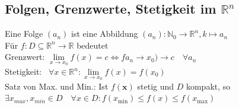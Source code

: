 \documentclass[6pt,a4paper]{scrartcl}
\newcommand{\norm}[1]{\ensuremath{\|#1\|}}														%
\renewcommand{\vec}[1]{\ensuremath{\boldsymbol {#1}}}											%
\begin{document}
\begin{multicols*}{4}
\subsection{Folgen, Grenzwerte, Stetigkeit im $\mathbb R^n$}
Eine Folge $(a_n)$ ist eine Abbildung $(a_n):\mathbb N_0 \rightarrow \mathbb R^n, k\mapsto a_n$\\
Für $f:D \subseteq \mathbb R^n \rightarrow \mathbb R$ bedeutet \\
Grenzwert: \quad  $\lim\limits_{x \rightarrow x_0} f(x) =c \Leftrightarrow f a_n \rightarrow x_0 \bigr) \rightarrow c\quad \forall a_n$\\
Stetigkeit: \quad \ $\forall x \in \mathbb R^n:\lim\limits_{x \rightarrow x_0} f(x) = f(x_0)$\\
Satz von Max. und Min.: Ist $f(\vec x)$ stetig und $D$ kompakt, so\\
$\exists x_{max},x_{min} \in D \quad \forall x\in D:f(x_{\text{min}}) \le f(x) \le f(x_{\text{max}})$


\end{multicols*}
\end{document}
